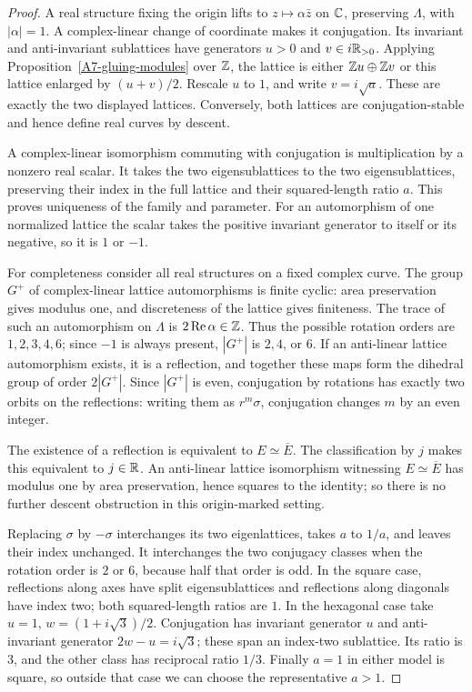 \begin{proof}
A real structure fixing the origin lifts to $z\mapsto\alpha\bar{z}$ on ${\mathbb{C}}$, preserving $\Lambda$, with $|\alpha|=1$. A complex-linear change of coordinate makes it conjugation. Its invariant and anti-invariant sublattices have generators $u>0$ and $v\in i{\mathbb{R}}_{>0}$. Applying Proposition~\ref{A7-gluing-modules} over ${\mathbb{Z}}$, the lattice is either ${\mathbb{Z}} u\oplus{\ensuremath{\mathbb{Z}}} v$ or this lattice enlarged by $(u+v)/2$. Rescale $u$ to $1$, and write $v=i\sqrt a$. These are exactly the two displayed lattices. Conversely, both lattices are conjugation-stable and hence define real curves by descent.

A complex-linear isomorphism commuting with conjugation is multiplication by a nonzero real scalar. It takes the two eigensublattices to the two eigensublattices, preserving their index in the full lattice and their squared-length ratio $a$. This proves uniqueness of the family and parameter. For an automorphism of one normalized lattice the scalar takes the positive invariant generator to itself or its negative, so it is $1$ or $-1$.

For completeness consider all real structures on a fixed complex curve. The group $G^+$ of complex-linear lattice automorphisms is finite cyclic: area preservation gives modulus one, and discreteness of the lattice gives finiteness. The trace of such an automorphism on $\Lambda$ is $2\operatorname{Re}\alpha\in{\ensuremath{\mathbb{Z}}}$. Thus the possible rotation orders are $1,2,3,4,6$; since $-1$ is always present, $|G^+|$ is $2,4$, or $6$. If an anti-linear lattice automorphism exists, it is a reflection, and together these maps form the dihedral group of order $2|G^+|$. Since $|G^+|$ is even, conjugation by rotations has exactly two orbits on the reflections: writing them as $r^m\sigma$, conjugation changes $m$ by an even integer.

The existence of a reflection is equivalent to $E\simeq\overline{E}$. The classification by $j$ \cite[II, Proposition 2.1(c)]{MilneEC2021A567} makes this equivalent to $j\in{\ensuremath{\mathbb{R}}}$. An anti-linear lattice isomorphism witnessing $E\simeq\overline{E}$ has modulus one by area preservation, hence squares to the identity; so there is no further descent obstruction in this origin-marked setting.

Replacing $\sigma$ by $-\sigma$ interchanges its two eigenlattices, takes $a$ to $1/a$, and leaves their index unchanged. It interchanges the two conjugacy classes when the rotation order is $2$ or $6$, because half that order is odd. In the square case, reflections along axes have split eigensublattices and reflections along diagonals have index two; both squared-length ratios are $1$. In the hexagonal case take $u=1$, $w=(1+i\sqrt3)/2$. Conjugation has invariant generator $u$ and anti-invariant generator $2w-u=i\sqrt3$; these span an index-two sublattice. Its ratio is $3$, and the other class has reciprocal ratio $1/3$. Finally $a=1$ in either model is square, so outside that case we can choose the representative $a>1$.
\end{proof}

